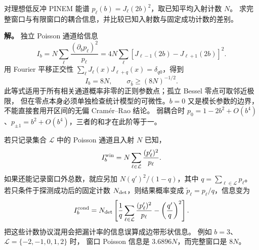 \begin{exbox}
对理想低反冲 PINEM 能谱 $p_\ell(b)=J_\ell(2b)^2$，取已知平均入射计数 $N$。
求完整窗口与有限窗口的耦合信息，并比较已知入射数与固定成功计数的差别。

\textbf{解。}
独立 Poisson 通道给信息
\[
I_b=N\sum_\ell\frac{(\partial_bp_\ell)^2}{p_\ell}
=4N\sum_\ell[J_{\ell-1}(2b)-J_{\ell+1}(2b)]^2.
\]
用 Fourier 平移正交性 $\sum_\ell J_\ell(x)J_{\ell+q}(x)=\delta_{q0}$，得到
\begin{equation}
I_b=8N,\qquad \sigma_{\widehat b}\ge(8N)^{-1/2}.
\label{eq:feqo-fisher-g-result}
\end{equation}
此等式适用于所有相关通道概率非零的正则参数点；孤立 Bessel 零点可取邻近极限，
但在零点本身必须单独检查统计模型的可微性。$b=0$ 又是模长参数的边界，
不能直接套用开区间的无偏 Cram\'er--Rao 结论。
弱耦合时 $p_0=1-2b^2+O(b^4)$、$p_{\pm1}=b^2+O(b^4)$，三者的和才在此阶等于一。

若只记录集合 $\mathcal L$ 中的 Poisson 通道且入射 $N$ 已知，
\begin{equation}
I_b^{\rm win}=N\sum_{\ell\in\mathcal L}\frac{(p_\ell')^2}{p_\ell}.
\label{eq:feqo-fisher-truncated}
\end{equation}
如果还能记录窗口外总数，就应另加
$N(q')^2/(1-q)$，其中 $q=\sum_{\ell\in\mathcal L}p_\ell$。
若只条件于探测成功后的固定计数 $N_{\rm det}$，则结果概率变成
$\widetilde p_\ell=p_\ell/q$，信息变为
\[
I_b^{\rm cond}=N_{\rm det}\left[
\frac1q\sum_{\ell\in\mathcal L}\frac{(p_\ell')^2}{p_\ell}
-\left(\frac{q'}q\right)^2\right].
\]
把这些计数协议混用会把漏计率的信息误算成边带形状信息。
例如 $b=3$、$\mathcal L=\{-2,-1,0,1,2\}$ 时，
窗口 Poisson 信息是 $3.6896N$，而完整窗口是 $8N$。
\end{exbox}

